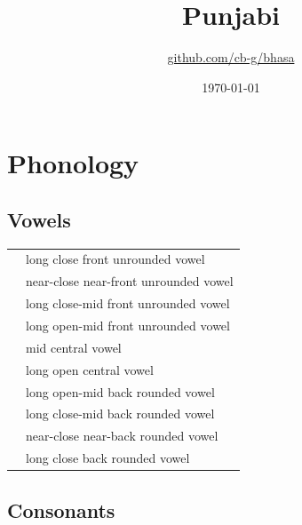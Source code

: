 \documentclass{article}
\title{Punjabi\\\ipa{[p@\textltailn"\t{\textdyoghlig}a\u{b}.bi]}}
\author{\href{https://github.com/cb-g/bhasa}{github.com/cb-g/bhasa}}
\date{\today}
\begin{document}
\pagecolor{custom_bg}\color{custom_fg}
\maketitle\thispagestyle{empty}

\newpage\setcounter{page}{1}\section{Phonology}

\subsection{Vowels}

\begin{xltabular}{\textwidth}{lL}
   & long close front unrounded vowel \\
   & near-close near-front unrounded vowel \\
   & long close-mid front unrounded vowel \\
   & long open-mid front unrounded vowel \\
   & mid central vowel \\
   & long open central vowel \\
   & long open-mid back rounded vowel \\
   & long close-mid back rounded vowel \\
   & near-close near-back rounded vowel \\
   & long close back rounded vowel \\
\end{xltabular}

\subsection{Consonants}
\end{document}
